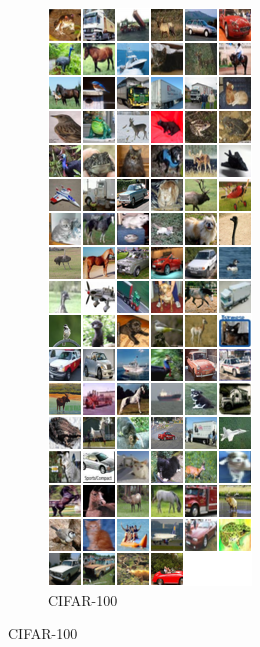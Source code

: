 \documentclass[11pt]{article}
\begin{document}
\begin{figure}[H]
\begin{subfigure}{.5\textwidth}
\includegraphics[scale=0.5]{assign2/torch/cifar100.png}
\caption{CIFAR-100 \label{fig2}}
\end{subfigure}
\end{figure}
\end{document}

